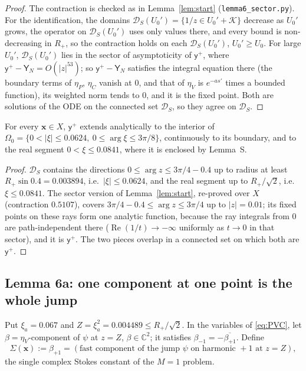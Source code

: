 \documentclass{amsart}
\numberwithin{equation}{section}
\theoremstyle{plain}
\newenvironment{lemnamed}[1]{\renewcommand\theinnerlem{#1}\innerlem}{\endinnerlem}
\theoremstyle{definition}
\theoremstyle{remark}
\newcommand{\re}{\operatorname{Re}}
\newcommand{\bx}{\mathbf{x}}
\newcommand{\repo}[1]{\texttt{#1}}
\begin{document}
\begin{proof}
The contraction is checked as in Lemma~\ref{lem:start} (\repo{lemma6\_sector.py}). For the identification, the domains
$\mathcal D_S(U_0') = \{1/z \in U_0' + \mathcal K\}$ decrease as $U_0'$ grows, the operator on $\mathcal D_S(U_0')$ uses only values there,
and every bound is non-decreasing in $R_+$, so the contraction holds on each $\mathcal D_S(U_0')$, $U_0' \ge U_0$. For large $U_0'$,
$\mathcal D_S(U_0')$ lies in the sector of asymptoticity of $\mathsf y^+$, where $\mathsf y^+ - \mathsf Y_N = O(|z|^{53})$; so $\mathsf y^+ - \mathsf Y_N$
satisfies the integral equation there (the boundary terms of $\eta_P$, $\eta_C$ vanish at $0$, and that of $\eta_V$ is $e^{-as'}$
times a bounded function), its weighted norm tends to $0$, and it is the fixed point. Both are solutions of the ODE on the
connected set $\mathcal D_S$, so they agree on $\mathcal D_S$.
\end{proof}

\begin{lemnamed}{6b$_0$}\label{lem:6b0}
For every $\bx \in X$, $\mathsf y^+$ extends analytically to the interior of $\Omega_0 = \{0 < |\xi| \le 0.0624,\ 0 \le \arg\xi \le 3\pi/8\}$,
continuously to its boundary, and to the real segment $0 < \xi \le 0.0841$, where it is enclosed by Lemma~S.
\end{lemnamed}

\begin{proof}
$\mathcal D_S$ contains the directions $0 \le \arg z \le 3\pi/4 - 0.4$ up to radius at least $R_+\sin0.4 = 0.003894$, i.e.\
$|\xi| \le 0.0624$, and the real segment up to $R_+/\sqrt2$, i.e.\ $\xi \le 0.0841$. The sector version of
Lemma~\ref{lem:start}, re-proved over $X$ (contraction $0.5107$), covers $3\pi/4 - 0.4 \le \arg z \le 3\pi/4$ up to $|z| = 0.01$; its
fixed points on these rays form one analytic function, because the ray integrals from $0$ are path-independent there
($\re(1/t) \to -\infty$ uniformly as $t \to 0$ in that sector), and it is $\mathsf y^+$. The two pieces overlap in a connected set
on which both are $\mathsf y^+$.
\end{proof}

\subsection{Lemma 6a: one component at one point is the whole jump}
Put $\xi_a = 0.067$ and $Z = \xi_a^2 = 0.004489 \le R_+/\sqrt2$. In the variables of \eqref{eq:PVC}, let $\beta = \eta_V$-component of
$\psi$ at $z = Z$, $\beta \in \mathbb C^2$; it satisfies $\beta_{-1} = -\overline{\beta_{+1}}$. Define
\begin{equation}\label{eq:Sigma}
\Sigma(\bx) := \beta_{+1} = (\text{fast component of the jump } \psi \text{ on harmonic } +1 \text{ at } z = Z),
\end{equation}
the single complex Stokes constant of the $M = 1$ problem.
\end{document}
